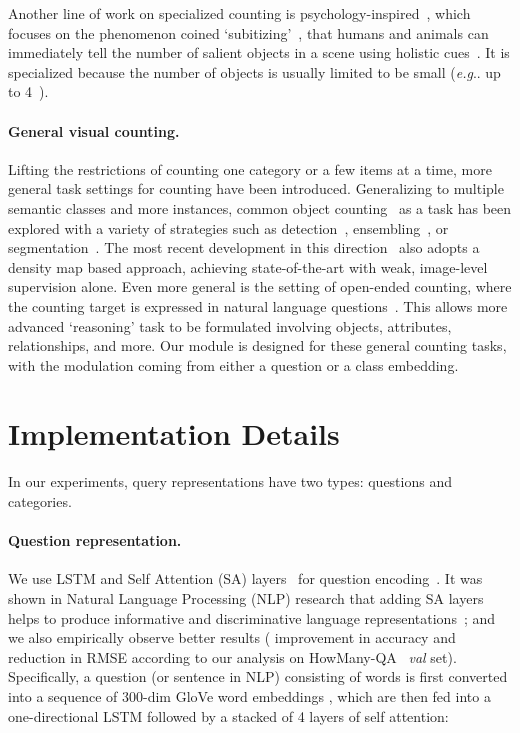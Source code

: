 \documentclass{article} \usepackage[dvipsnames,table]{xcolor}
\makeatletter
\DeclareRobustCommand\onedot{\futurelet\@let@token\@onedot}
\def\@onedot{\ifx\@let@token.\else.\null\fi\xspace}
\def\eg{\emph{e.g}\onedot} \def\Eg{\emph{E.g}\onedot}
\makeatother
\begin{document}
Another line of work on specialized counting is psychology-inspired~\cite{cutini2012subitizing}, which focuses on the phenomenon coined `subitizing'~\cite{kaufman1949discrimination}, that humans and animals can immediately tell the number of salient objects in a scene using holistic cues~\cite{zhang2015salient}. It is specialized because the number of objects is usually limited to be small (\eg up to 4~\cite{zhang2015salient}).

\paragraph{General visual counting.} Lifting the restrictions of counting one category or a few items at a time, more general task settings for counting have been introduced. Generalizing to multiple semantic classes and more instances, common object counting~\cite{chattopadhyay2017counting} as a task has been explored with a variety of strategies such as detection~\cite{ren2015faster}, ensembling~\cite{galton1907one}, or segmentation~\cite{laradji2018blobs}. The most recent development in this direction~\cite{cholakkal2019object} also adopts a density map based approach, achieving state-of-the-art with weak, image-level supervision alone. Even more general is the setting of open-ended counting, where the counting target is expressed in natural language questions~\cite{acharya2019tallyqa}. This allows more advanced `reasoning' task to be formulated involving objects, attributes, relationships, and more. Our module is designed for these general counting tasks, with the modulation coming from either a question or a class embedding.

\section{Implementation Details\label{sec:detail}}
In our experiments, query representations  have two types: questions and categories. 

\paragraph{Question representation.} We use LSTM and Self Attention (SA) layers~\cite{vaswani2017attention} for question encoding~\cite{yu2019deep}. It was shown in Natural Language Processing (NLP) research that adding SA layers helps to produce informative and discriminative language representations~\cite{devlin2019bert}; and we also empirically observe better results ( improvement in accuracy and  reduction in RMSE according to our analysis on HowMany-QA~\cite{trott2018interpretable} \emph{val} set). Specifically, a question (or sentence in NLP) consisting of  words is first converted into a sequence  of  300-dim GloVe word embeddings \cite{pennington2014glove}, which are then fed into a one-directional LSTM followed by a stacked of 4 layers of self attention:
\end{document}
